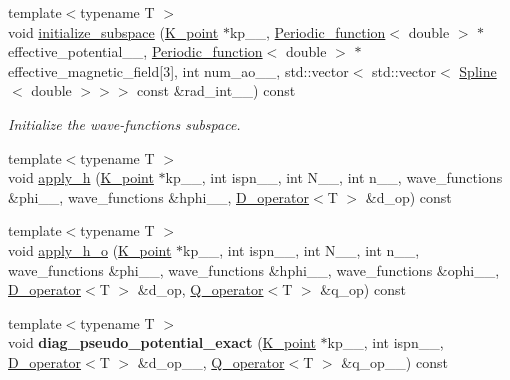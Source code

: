 \begin{DoxyCompactItemize}
\item 
{\footnotesize template$<$typename T $>$ }\\void \hyperlink{classsirius_1_1_band_a249d17383e8d8f822c5b2bbc251c0bb6}{initialize\+\_\+subspace} (\hyperlink{classsirius_1_1_k__point}{K\+\_\+point} $\ast$kp\+\_\+\+\_\+, \hyperlink{classsirius_1_1_periodic__function}{Periodic\+\_\+function}$<$ double $>$ $\ast$effective\+\_\+potential\+\_\+\+\_\+, \hyperlink{classsirius_1_1_periodic__function}{Periodic\+\_\+function}$<$ double $>$ $\ast$effective\+\_\+magnetic\+\_\+field\mbox{[}3\mbox{]}, int num\+\_\+ao\+\_\+\+\_\+, std\+::vector$<$ std\+::vector$<$ \hyperlink{classsirius_1_1_spline}{Spline}$<$ double $>$$>$$>$ const \&rad\+\_\+int\+\_\+\+\_\+) const 
\begin{DoxyCompactList}\small\item\em Initialize the wave-\/functions subspace. \end{DoxyCompactList}\item 
{\footnotesize template$<$typename T $>$ }\\void \hyperlink{classsirius_1_1_band_a3aa9361ef432d4cca5e0047b8bee8e19}{apply\+\_\+h} (\hyperlink{classsirius_1_1_k__point}{K\+\_\+point} $\ast$kp\+\_\+\+\_\+, int ispn\+\_\+\+\_\+, int N\+\_\+\+\_\+, int n\+\_\+\+\_\+, wave\+\_\+functions \&phi\+\_\+\+\_\+, wave\+\_\+functions \&hphi\+\_\+\+\_\+, \hyperlink{classsirius_1_1_d__operator}{D\+\_\+operator}$<$T $>$ \&d\+\_\+op) const 
\item 
{\footnotesize template$<$typename T $>$ }\\void \hyperlink{classsirius_1_1_band_ac3d1880e4a89fea7c75d6f2ebb8a0edb}{apply\+\_\+h\+\_\+o} (\hyperlink{classsirius_1_1_k__point}{K\+\_\+point} $\ast$kp\+\_\+\+\_\+, int ispn\+\_\+\+\_\+, int N\+\_\+\+\_\+, int n\+\_\+\+\_\+, wave\+\_\+functions \&phi\+\_\+\+\_\+, wave\+\_\+functions \&hphi\+\_\+\+\_\+, wave\+\_\+functions \&ophi\+\_\+\+\_\+, \hyperlink{classsirius_1_1_d__operator}{D\+\_\+operator}$<$T $>$ \&d\+\_\+op, \hyperlink{classsirius_1_1_q__operator}{Q\+\_\+operator}$<$T $>$ \&q\+\_\+op) const 
\item 
\hypertarget{classsirius_1_1_band_aeeef6350cde82c79b7ac3e3e7343a103}{}{\footnotesize template$<$typename T $>$ }\\void {\bfseries diag\+\_\+pseudo\+\_\+potential\+\_\+exact} (\hyperlink{classsirius_1_1_k__point}{K\+\_\+point} $\ast$kp\+\_\+\+\_\+, int ispn\+\_\+\+\_\+, \hyperlink{classsirius_1_1_d__operator}{D\+\_\+operator}$<$T $>$ \&d\+\_\+op\+\_\+\+\_\+, \hyperlink{classsirius_1_1_q__operator}{Q\+\_\+operator}$<$T $>$ \&q\+\_\+op\+\_\+\+\_\+) const \label{classsirius_1_1_band_aeeef6350cde82c79b7ac3e3e7343a103}


\end{DoxyCompactItemize}
